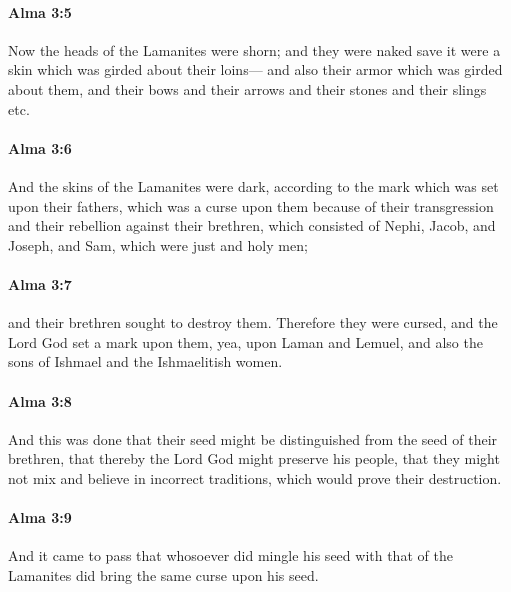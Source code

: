 		\paragraph{Alma 3:5} %
			\label{ALMA-3-5}

			Now the heads of the Lamanites were shorn;
			and they were naked save it were a skin which was girded about their loins---
			and also their armor which was girded about them,
			and their bows and their arrows and their stones and their slings etc.

		\paragraph{Alma 3:6} %
			\label{ALMA-3-6}

			And the skins of the Lamanites were dark,
			according to the mark which was set upon their fathers,
			which was a curse upon them
			because of their transgression and their rebellion against their brethren,
			which consisted of Nephi, Jacob, and Joseph, and Sam,
			which were just and holy men;

		\paragraph{Alma 3:7} %
			\label{ALMA-3-7}

			and their brethren sought to destroy them.
			Therefore they were cursed,
			and the Lord God set a mark upon them,
			yea, upon Laman and Lemuel,
			and also the sons of Ishmael and the Ishmaelitish women.

		\paragraph{Alma 3:8} %
			\label{ALMA-3-8}

			And this was done
			that their seed might be distinguished from the seed of their brethren,
			that thereby the Lord God might preserve his people,
			that they might not mix and believe in incorrect traditions,
			which would prove their destruction.

		\paragraph{Alma 3:9} %
			\label{ALMA-3-9}

			And it came to pass that
			whosoever did mingle his seed with that of the Lamanites
			did bring the same curse upon his seed.

